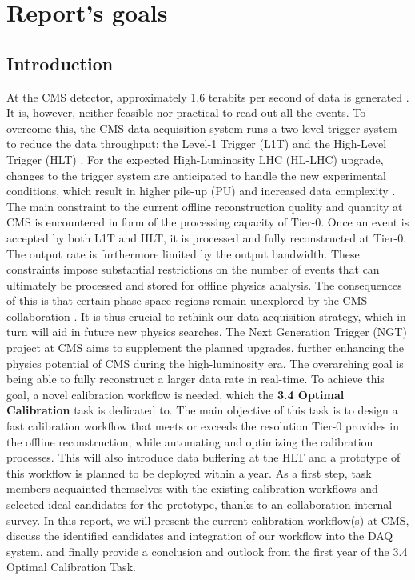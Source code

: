 \chapter{Report's goals}

\section{Introduction}

At the CMS detector, approximately 1.6 terabits per second of data is generated \cite{CMScollab}. It is, however, neither feasible nor practical to read out all the events. To overcome this, the CMS data acquisition system runs a two level trigger system to reduce the data throughput: the Level-1 Trigger (L1T) and the High-Level Trigger (HLT) \cite{cms2016_triggers}. For the expected High-Luminosity LHC (HL-LHC) upgrade, changes to the trigger system are anticipated  
to handle the new experimental conditions, which result in higher pile-up (PU) and increased data complexity \cite{Collaboration:2759072, CERN-LHCC-2020-004}. 
\newline \newline 
The main constraint to the current offline reconstruction quality and quantity at CMS is encountered in form of the processing capacity of Tier-0. Once an event is accepted by both L1T and HLT, it is processed and fully reconstructed at Tier-0. The output rate is furthermore limited by the output bandwidth. These constraints impose substantial restrictions on the number of events that can ultimately be processed and stored for offline physics analysis. The consequences of this is that certain phase space regions remain unexplored by the CMS collaboration \cite{cms_exotica_summary_plots}. It is thus crucial to rethink our data acquisition strategy, which in turn will aid in future new physics searches. 
The Next Generation Trigger (NGT) project at CMS aims to supplement the planned upgrades, further enhancing the physics potential of CMS during the high-luminosity era. The overarching goal is being able to fully reconstruct a larger data rate in real-time.
\newline \newline
To achieve this goal, a novel calibration workflow is needed, which the \textbf{3.4 Optimal Calibration} task is dedicated to. The main objective of this task is to design a fast calibration workflow that meets or exceeds the resolution Tier-0 provides in the offline reconstruction, while automating and optimizing the calibration processes. This will also introduce data buffering at the HLT and a prototype of this workflow is planned to be deployed within a year. As a first step, task members acquainted themselves with the existing calibration workflows and selected ideal candidates for the prototype, thanks to an collaboration-internal survey. In this report, we will present the current calibration workflow(s) at CMS, discuss the identified candidates and integration of our workflow into the DAQ system, and finally provide a conclusion and outlook from the first year of the 3.4 Optimal Calibration Task.


